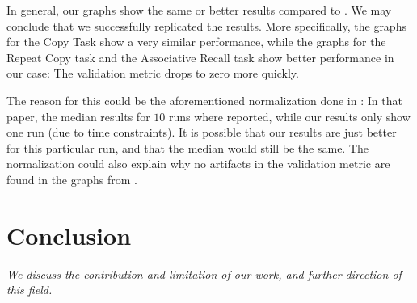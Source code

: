 \documentclass[12pt,twoside]{article}
\theoremstyle{plain}
\theoremstyle{definition}
\theoremstyle{remark}
\begin{document}
In general, our graphs show the same or better results compared to \cite{implementing-ntm}. We may conclude that we successfully replicated the results. More specifically, the graphs for the Copy Task show a very similar performance, while the graphs for the Repeat Copy task and the Associative Recall task show better performance in our case: The validation metric drops to zero more quickly.

The reason for this could be the aforementioned normalization done in \cite{implementing-ntm}: In that paper, the median results for $10$ runs where reported, while our results only show one run (due to time constraints). It is possible that our results are just better for this particular run, and that the median would still be the same. The normalization could also explain why no artifacts in the validation metric are found in the graphs from \cite{implementing-ntm}.

\section{Conclusion}
\textit{We discuss the contribution and limitation of our work, and further direction of this field.}

%
\newpage


\end{document}
